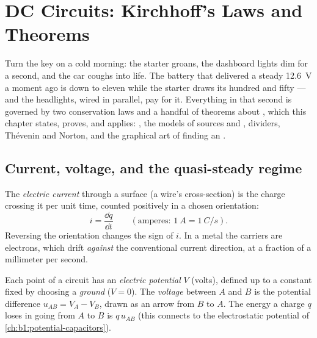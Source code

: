 \chapter{DC Circuits: Kirchhoff's Laws and Theorems}\label{ch:b1:dc-circuits}

Turn the key on a cold morning: the starter groans, the dashboard lights
dim for a second, and the car coughs into life. The battery that
delivered a steady \qty{12.6}{V} a moment ago is down to eleven while
the starter draws its hundred and fifty  --- and the headlights,
wired in parallel, pay for it. Everything in that second is governed by
two conservation laws and a handful of theorems about ,
which this chapter states, proves, and applies: , the
models of sources and , dividers, Thévenin and Norton, and
the graphical art of finding an .

\section{Current, voltage, and the quasi-steady regime}

\begin{definition}\label{def:b1:dc-circuits:current}
The \emph{electric current} through a surface (a wire's cross-section)
is the charge crossing it per unit time, counted positively in a chosen
orientation:
\[
i = \frac{\dd q}{\dd t} \qquad (\text{amperes: } \qty{1}{A} = \qty{1}{C/s}).
\]
Reversing the orientation changes the sign of $i$. In a metal the
carriers are electrons, which drift \emph{against} the conventional
current direction, at a fraction of a millimeter per second.
\end{definition}

\begin{definition}\label{def:b1:dc-circuits:voltage}
Each point of a circuit has an \emph{electric potential} $V$ (volts),
defined up to a constant fixed by choosing a \emph{ground} ($V = 0$).
The \emph{voltage} between $A$ and $B$ is the potential difference
$u_{AB} = V_A - V_B$, drawn as an arrow from $B$ to $A$. The energy a
charge $q$ loses in going from $A$ to $B$ is $q\,u_{AB}$ (this connects
to the electrostatic potential of \cref{ch:b1:potential-capacitors}).
\end{definition}

